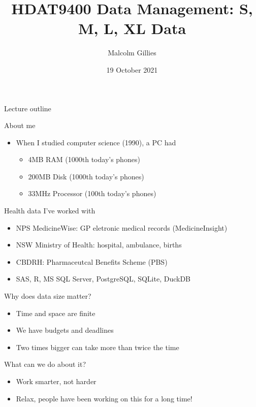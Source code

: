 \documentclass[aspectratio=169,12pt,usepdftitle=false]{beamer} %
\title{HDAT9400 Data Management: S, M, L, XL Data}
\institute{\url{https://github.com/mbg-unsw/hdat9400}}
\author{Malcolm Gillies}
\date{19 October 2021}
\begin{document}
{
\begin{frame}
\titlepage
\end{frame}
}

\begin{frame}{Lecture outline}
\end{frame}

\begin{frame}{About me}
    \begin{itemize}
        \item When I studied computer science (1990), a PC had
	    \begin{itemize}
		\item 4MB RAM (1000th today's phones)
		\item 200MB Disk (1000th today's phones)
		\item 33MHz Processor (100th today's phones)
	    \end{itemize}
    \end{itemize}
\end{frame}

\begin{frame}{Health data I've worked with}
    \begin{itemize}
	\item NPS MedicineWise: GP eletronic medical records (MedicineInsight)
	\item NSW Ministry of Health: hospital, ambulance, births
	\item CBDRH: Pharmaceutcal Benefits Scheme (PBS)
	\item SAS, R, MS SQL Server, PostgreSQL, SQLite, DuckDB
    \end{itemize}
\end{frame}

\begin{frame}{Why does data size matter?}
    \begin{itemize}
        \item Time and space are finite
	\item We have budgets and deadlines
	\item Two times bigger can take more than twice the time
    \end{itemize}
\end{frame}


\begin{frame}{What can we do about it?}
    \begin{itemize}
	\item Work smarter, not harder
	\item Relax, people have been working on this for a long time!
    \end{itemize}
\end{frame}
\end{document}
